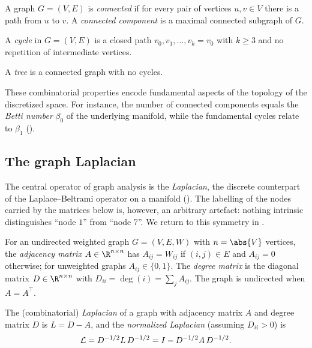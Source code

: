 \begin{definition}
\label{def:graphs:connected}
A graph $G = (V, E)$ is \emph{connected} if for every pair of vertices
$u, v \in V$ there is a path from $u$ to $v$. A \emph{connected component} is a
maximal connected subgraph of $G$.
\end{definition}

\begin{definition}[Cycle]
\label{def:graphs:cycle}
A \emph{cycle} in $G = (V, E)$ is a closed path $v_0, v_1, \dots, v_k = v_0$ with
$k \ge 3$ and no repetition of intermediate vertices.
\end{definition}

\begin{definition}[Tree]
\label{def:graphs:tree}
A \emph{tree} is a connected graph with no cycles.
\end{definition}

These combinatorial properties encode fundamental aspects of the topology of the
discretized space. For instance, the number of connected components equals the
\emph{Betti number} $\beta_0$ of the underlying manifold, while the fundamental
cycles relate to $\beta_1$ ().

\subsection{The graph Laplacian}
\label{sec:graphs:laplacian}

The central operator of graph analysis is the \emph{Laplacian}, the discrete
counterpart of the Laplace--Beltrami operator on a manifold ().
The labelling of the nodes carried by the matrices below is, however, an
arbitrary artefact: nothing intrinsic distinguishes ``node $1$'' from ``node
$7$''. We return to this symmetry in .

\begin{definition}
\label{def:graphs:adjacency}
For an undirected weighted graph $G = (V, E, W)$ with $n = \abs{V}$ vertices, the
\emph{adjacency matrix} $A \in \R^{n \times n}$ has $A_{ij} = W_{ij}$ if
$(i,j) \in E$ and $A_{ij} = 0$ otherwise; for unweighted graphs
$A_{ij} \in \{0,1\}$. The \emph{degree matrix} is the diagonal matrix
$D \in \R^{n \times n}$ with $D_{ii} = \deg(i) = \sum_j A_{ij}$. The graph is
undirected when $A = A^\top$.
\end{definition}

\begin{definition}
\label{def:graphs:laplacian}
The (combinatorial) \emph{Laplacian} of a graph with adjacency matrix $A$ and
degree matrix $D$ is $L = D - A$, and the \emph{normalized Laplacian} (assuming
$D_{ii} > 0$) is
\[
  \mathcal{L} = D^{-1/2} L\, D^{-1/2} = I - D^{-1/2} A\, D^{-1/2}.
\]
\end{definition}

